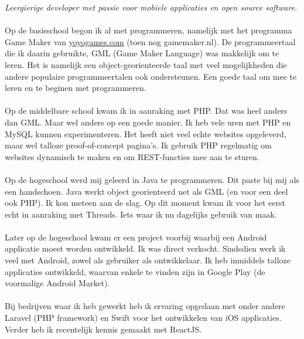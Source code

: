 \documentclass[10pt,a4paper]{article}
\begin{document}
\vspace{-1.3em}  %
\begin{multicols}{2}  %
\noindent \emph{Leergierige developer met passie voor mobiele applicaties en open source software.}
\\
\\
Op de basisschool begon ik al met programmeren, namelijk met het programma Game Maker van \href{http://www.yoyogames.com}{yoyogames.com} (toen nog gamemaker.nl). De programmeertaal die ik daarin gebruikte, GML (Game Maker Language) was makkelijk om te leren. Het is namelijk een object-georienteerde taal met veel mogelijkheden die andere populaire programmeertalen ook ondersteunen. Een goede taal om mee te leren en te beginen met programmeren.
\\
\\
Op de middelbare school kwam ik in aanraking met PHP. Dat was heel anders dan GML. Maar wel anders op een goede manier. Ik heb vele uren met PHP en MySQL kunnen experimenteren. Het heeft niet veel echte websites opgeleverd, maar wel talloze proof-of-concept pagina's. Ik gebruik PHP regelmatig om websites dynamisch te maken en om REST-functies mee aan te sturen.
\\
\\
Op de hogeschool werd mij geleerd in Java te programmeren. Dit paste bij mij als een handschoen. Java werkt object georienteerd net als GML (en voor een deel ook PHP). Ik kon meteen aan de slag. Op dit moment kwam ik voor het eerst echt in aanraking met Threads. Iets waar ik nu dagelijks gebruik van maak.
\\
\\
Later op de hogeschool kwam er een project voorbij waarbij een Android applicatie moest worden ontwikkeld. Ik was direct verkocht.
Sindsdien werk ik veel met Android, zowel als gebruiker als ontwikkelaar.
Ik heb inmiddels talloze applicaties ontwikkeld, waarvan enkele te vinden zijn in Google Play (de voormalige Android Market).
\\
\\
Bij bedrijven waar ik heb gewerkt heb ik ervaring opgedaan met onder andere Laravel (PHP framework) en Swift voor het ontwikkelen van iOS applicaties. Verder heb ik recentelijk kennis gemaakt met ReactJS. 
\end{multicols}

\spacedhrule{0em}{-0.4em}

\end{document}
